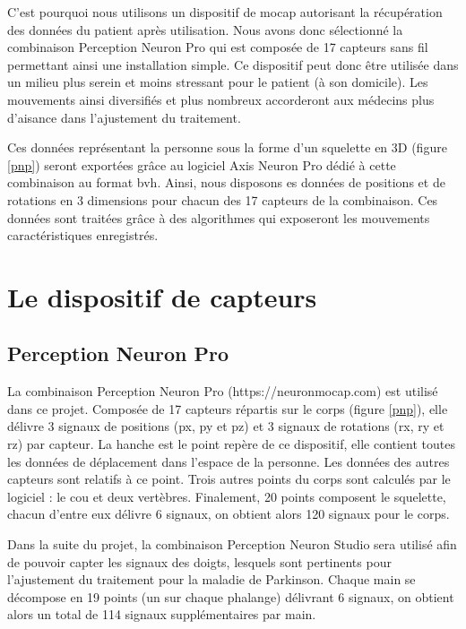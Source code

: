\documentclass{article}
\begin{document}
C'est pourquoi nous utilisons un dispositif de \acrshort{mocap} autorisant la récupération des données du patient après utilisation. Nous avons donc sélectionné la combinaison Perception Neuron Pro qui est composée de 17 capteurs sans fil permettant ainsi une installation simple. Ce dispositif peut donc être utilisée dans un milieu plus serein et moins stressant pour le patient (à son domicile). Les mouvements ainsi diversifiés et plus nombreux accorderont aux médecins plus d'aisance dans l'ajustement du traitement.

Ces données représentant la personne sous la forme d'un squelette en 3D (figure \ref{pnp}) seront exportées grâce au logiciel Axis Neuron Pro dédié à cette combinaison au format \acrshort{bvh}. Ainsi, nous disposons es données de positions et de rotations en 3 dimensions pour chacun des 17 capteurs de la combinaison. Ces données sont traitées grâce à des algorithmes qui exposeront les mouvements caractéristiques enregistrés.

\section{Le dispositif de capteurs}

\subsection{Perception Neuron Pro}

La combinaison Perception Neuron Pro (https://neuronmocap.com) est utilisé dans ce projet. Composée de 17 capteurs répartis sur le corps (figure \ref{pnp}), elle délivre 3 signaux de positions (px, py et pz) et 3 signaux de rotations (rx, ry et rz) par capteur. La hanche est le point repère de ce dispositif, elle contient toutes les données de déplacement dans l'espace de la personne. Les données des autres capteurs sont relatifs à ce point. Trois autres points du corps sont calculés par le logiciel : le cou et deux vertèbres. Finalement, 20 points composent le squelette, chacun d'entre eux délivre 6 signaux, on obtient alors 120 signaux pour le corps.

Dans la suite du projet, la combinaison Perception Neuron Studio sera utilisé afin de pouvoir capter les signaux des doigts, lesquels sont pertinents pour l'ajustement du traitement pour la maladie de Parkinson. Chaque main se décompose en 19 points (un sur chaque phalange) délivrant 6 signaux, on obtient alors un total de 114 signaux supplémentaires par main.
\end{document}

